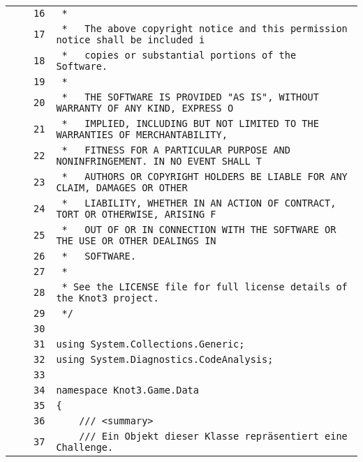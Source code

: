 \documentclass[a4paper,10pt]{article}
\begin{document}
\begin{longtable}[l]{lrrl}
\cellcolor{gray} &  & \verb~16~ & \verb~ *~\\
\cellcolor{gray} &  & \verb~17~ & \verb~ *   The above copyright notice and this permission notice shall be included i~\\
\cellcolor{gray} &  & \verb~18~ & \verb~ *   copies or substantial portions of the Software.~\\
\cellcolor{gray} &  & \verb~19~ & \verb~ *~\\
\cellcolor{gray} &  & \verb~20~ & \verb~ *   THE SOFTWARE IS PROVIDED "AS IS", WITHOUT WARRANTY OF ANY KIND, EXPRESS O~\\
\cellcolor{gray} &  & \verb~21~ & \verb~ *   IMPLIED, INCLUDING BUT NOT LIMITED TO THE WARRANTIES OF MERCHANTABILITY,~\\
\cellcolor{gray} &  & \verb~22~ & \verb~ *   FITNESS FOR A PARTICULAR PURPOSE AND NONINFRINGEMENT. IN NO EVENT SHALL T~\\
\cellcolor{gray} &  & \verb~23~ & \verb~ *   AUTHORS OR COPYRIGHT HOLDERS BE LIABLE FOR ANY CLAIM, DAMAGES OR OTHER~\\
\cellcolor{gray} &  & \verb~24~ & \verb~ *   LIABILITY, WHETHER IN AN ACTION OF CONTRACT, TORT OR OTHERWISE, ARISING F~\\
\cellcolor{gray} &  & \verb~25~ & \verb~ *   OUT OF OR IN CONNECTION WITH THE SOFTWARE OR THE USE OR OTHER DEALINGS IN~\\
\cellcolor{gray} &  & \verb~26~ & \verb~ *   SOFTWARE.~\\
\cellcolor{gray} &  & \verb~27~ & \verb~ *~\\
\cellcolor{gray} &  & \verb~28~ & \verb~ * See the LICENSE file for full license details of the Knot3 project.~\\
\cellcolor{gray} &  & \verb~29~ & \verb~ */~\\
\cellcolor{gray} &  & \verb~30~ & \verb~~\\
\cellcolor{gray} &  & \verb~31~ & \verb~using System.Collections.Generic;~\\
\cellcolor{gray} &  & \verb~32~ & \verb~using System.Diagnostics.CodeAnalysis;~\\
\cellcolor{gray} &  & \verb~33~ & \verb~~\\
\cellcolor{gray} &  & \verb~34~ & \verb~namespace Knot3.Game.Data~\\
\cellcolor{gray} &  & \verb~35~ & \verb~{~\\
\cellcolor{gray} &  & \verb~36~ & \verb~    /// <summary>~\\
\cellcolor{gray} &  & \verb~37~ & \verb~    /// Ein Objekt dieser Klasse repräsentiert eine Challenge.~\\

\end{longtable}
\end{document}
